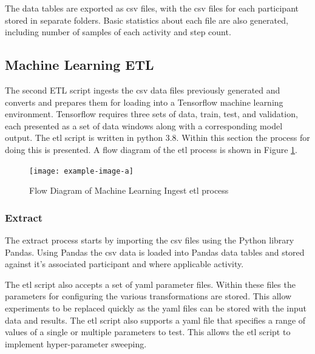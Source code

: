The data tables are exported as \acrfull{csv} files, with the \acrshort{csv} files for each participant stored in separate folders. Basic statistics about each file are also generated, including number of samples of each activity and step count.

\subsection{Machine Learning ETL}
\label{subsec:ML-ETL}
The second ETL script ingests the \acrshort{csv} data files previously generated and converts and prepares them for loading into a Tensorflow machine learning environment. Tensorflow requires three sets of data, train, test, and validation, each presented as a set of data windows along with a corresponding model output. The \acrshort{etl} script is written in python 3.8. Within this section the process for doing this is presented. A flow diagram of the \acrshort{etl} process is shown in Figure \ref{fig:methods_ml_ETL}.

\begin{figure}[!hbt]
    \centering
    \texttt{[image: example-image-a]}
    \caption{Flow Diagram of Machine Learning Ingest \acrshort{etl} process}
    \label{fig:methods_ml_ETL}
\end{figure}

\subsubsection{Extract}
The extract process starts by importing the \acrshort{csv} files using the Python library Pandas. Using Pandas the \acrshort{csv} data is loaded into Pandas data tables and stored against it's associated participant and where applicable activity.

The \acrshort{etl} script also accepts a set of \acrshort{yaml} parameter files. Within these files the parameters for configuring the various transformations are stored. This allow experiments to be replaced quickly as the \acrshort{yaml} files can be stored with the input data and results. The \acrshort{etl} script also supports a \acrshort{yaml} file that specifies a range of values of a single or multiple parameters to test. This allows the \acrshort{etl} script to implement hyper-parameter sweeping.


